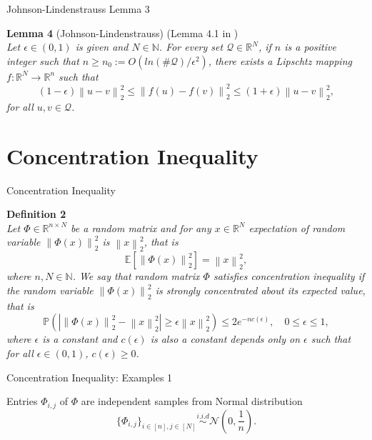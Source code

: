 \documentclass{beamer}
\newcommand\norm[1]{\left\lVert#1\right\rVert}
\newcommand*\by{{\times}}
\begin{document}
\begin{frame}{Johnson-Lindenstrauss Lemma 3}

\noindent
{\bf Lemma 4} (Johnson-Lindenstrauss) (Lemma 4.1 in \citep{isometry}) \\
{\it
Let $\epsilon \in (0, 1)$ is given and $N \in \mathbb{N}$. For every set $\mathcal{Q} \in \mathbb{R}^N$, if $n$ is a positive integer such that $n \ge n_0 := O(ln(\#\mathcal{Q})/\epsilon^2)$, there exists a Lipschtz mapping $f : \mathbb{R}^N \rightarrow \mathbb{R}^n$ such that 
\begin{equation}
\label{eqn:jl}
(1 - \epsilon) \norm{u - v}_2^2 \leq \norm{f(u) - f(v)}_2^2 \leq (1 + \epsilon) \norm{u - v}_2^2,
\end{equation}
for all $u, v \in \mathcal{Q}$.
}
    
\end{frame}

\section{Concentration Inequality}

\begin{frame}{Concentration Inequality}

    {\bf Definition 2} \\
{\it Let $\Phi \in \mathbb{R}^{n \by N}$ be a random matrix and for any $x \in \mathbb{R}^N$ expectation of random variable $\norm{\Phi(x)}_2^2$ is $\norm{x}_2^2$, that is 
$$
\mathbb{E}[\norm{\Phi(x)}_2^2] = \norm{x}_2^2,
$$
where $n, N \in \mathbb{N}$. We say that random matrix $\Phi$ satisfies concentration inequality if the random variable $\norm{\Phi(x)}_2^2$ is strongly concentrated about its expected value, that is
$$
\mathbb{P}(|\norm{\Phi(x)}_2^2 - \norm{x}_2^2| \geq \epsilon\norm{x}_2^2) \leq 2e^{-nc(\epsilon)}, \quad 0 \le \epsilon \le 1, 
$$
where $\epsilon$ is a constant and $c(\epsilon)$ is also a constant depends only on $\epsilon$ such that for all $\epsilon \in (0, 1)$, $c(\epsilon) \ge 0$.
} \\
\end{frame}

\begin{frame}{Concentration Inequality: Examples 1}

Entries $\Phi_{i, j}$ of $\Phi$ are independent samples from Normal distribution $$
    \{\Phi_{i, j}\}_{i \in [n], j \in [N]} \stackrel{i.i.d}{\sim} \mathcal{N}(0, \frac{1}{n}).
    $$
    
\end{frame}
\end{document}

